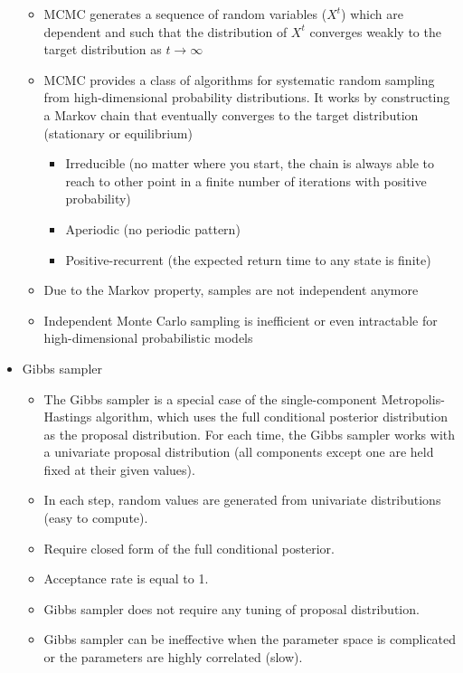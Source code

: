 \documentclass[a4paper]{article}
\begin{document}
\begin{itemize}
\begin{itemize}
        \item MCMC generates a sequence of random variables ($X^t$) which are dependent and such that the distribution of $X^t$ converges weakly to the target distribution as $t\to\infty$
        \item MCMC provides a class of algorithms for systematic random sampling from high-dimensional probability distributions. It works by constructing a Markov chain that eventually converges to the target distribution (stationary or equilibrium)
        \begin{itemize}
            \item Irreducible (no matter where you start, the chain is always able to reach to other point in a finite number of iterations with positive probability)
            \item Aperiodic (no periodic pattern)
            \item Positive-recurrent (the expected return time to any state is finite)
        \end{itemize}
        \item Due to the Markov property, samples are not independent anymore
        \item Independent Monte Carlo sampling is inefficient or even intractable for high-dimensional probabilistic models
    \end{itemize}
    \item Gibbs sampler
    \begin{itemize}
        \item The Gibbs sampler is a special case of the single-component Metropolis-Hastings algorithm, which uses the full conditional posterior distribution as the proposal distribution. For each time, the Gibbs sampler works with a univariate proposal distribution (all components except one are held fixed at their given values).
        \item In each step, random values are generated from univariate distributions (easy to compute).
        \item Require closed form of the full conditional posterior.
        \item Acceptance rate is equal to 1.
        \item Gibbs sampler does not require any tuning of proposal distribution.
        \item Gibbs sampler can be ineffective when the parameter space is complicated or the parameters are highly correlated (slow).
    \end{itemize}

\end{itemize}
\end{document}
